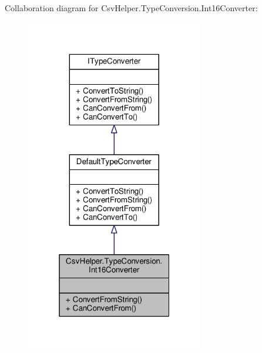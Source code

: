 Collaboration diagram for Csv\-Helper.\-Type\-Conversion.\-Int16\-Converter\-:
\nopagebreak
\begin{figure}[H]
\begin{center}
\leavevmode
\includegraphics[width=220pt]{d4/d4b/a00471}
\end{center}
\end{figure}
